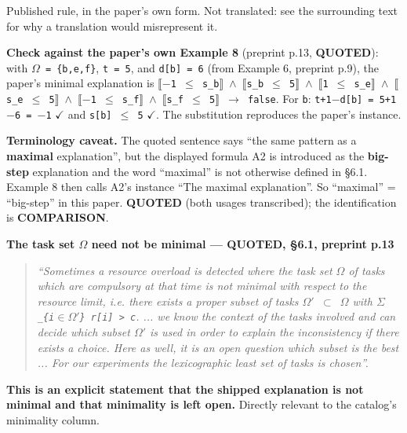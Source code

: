 \documentclass[10pt,a4paper]{article}
\newcommand{\provtag}[2]{{\small\sffamily\bfseries\textcolor{#1}{#2}}}
\newenvironment{pubblock}{%
  \par\smallskip
  \def\FrameCommand{\textcolor{litbar}{\vrule width 2.5pt}\hspace{9pt}}%
  \MakeFramed{\advance\hsize-\width\FrameRestore}}%
  {\endMakeFramed\par\smallskip}
\newcommand{\litsubsub}[1]{\par{\sffamily\bfseries\small #1\par}}
\newcommand{\rulekind}[1]{\par{\small\sffamily\textcolor{litbar}{#1}\par}}
\newcommand{\litline}[1]{\noindent
  \resizebox{\ifdim\width>\linewidth\linewidth\else\width\fi}{!}{#1}\par}
\begin{document}
\begin{pubblock}
\rulekind{Published rule, in the paper's own form. Not translated: see the surrounding text for why a translation would misrepresent it.}
{\raggedright
\litline{\ttfamily\small $\forall$i $\in$ $\Omega$ : $\llbracket$t + 1 $-$ d[i] $\leq$ s[i]$\rrbracket$ $\wedge$ $\llbracket$s[i] $\leq$ t$\rrbracket$ $\rightarrow$ false}
\par}
\textbf{Check against the paper's own Example 8} (preprint p.13, \provtag{tagquoted}{QUOTED}): with \texttt{$\Omega$ = \{b,e,f\}}, \texttt{t = 5}, and \texttt{d[b] = 6} (from Example 6, preprint p.9), the paper's minimal explanation is \texttt{$\llbracket$$-\allowbreak{}$1 $\leq$ s\_\allowbreak{}b$\rrbracket$ $\wedge$ $\llbracket$s\_\allowbreak{}b $\leq$ 5$\rrbracket$ $\wedge$ $\llbracket$1 $\leq$ s\_\allowbreak{}e$\rrbracket$ $\wedge$ $\llbracket$s\_\allowbreak{}e $\leq$ 5$\rrbracket$ $\wedge$ $\llbracket$$-\allowbreak{}$1 $\leq$ s\_\allowbreak{}f$\rrbracket$ $\wedge$ $\llbracket$s\_\allowbreak{}f $\leq$ 5$\rrbracket$ $\rightarrow$ false}. For \texttt{b}: \texttt{t+1$-$d[b] = 5+1$-$6 = $-$1} $\checkmark$ and \texttt{s[b] $\leq$ 5} $\checkmark$. The substitution reproduces the paper's instance.

\textbf{Terminology caveat.} The quoted sentence says ``the same pattern as a \textbf{maximal} explanation'', but the displayed formula A2 is introduced as the \textbf{big-step} explanation and the word ``maximal'' is not otherwise defined in \S{}6.1. Example 8 then calls A2's instance ``The maximal explanation''. So ``maximal'' = ``big-step'' in this paper. \provtag{tagquoted}{QUOTED} (both usages transcribed); the identification is \provtag{tagcomparison}{COMPARISON}.

\litsubsub{The task set \texttt{$\Omega$} need not be minimal --- \provtag{tagquoted}{QUOTED}, \S{}6.1, preprint p.13}
\begin{quotation}\small\itshape
``Sometimes a resource overload is detected where the task set \texttt{$\Omega$} of tasks which are compulsory at that time is not minimal with respect to the resource limit, i.e. there exists a proper subset of tasks \texttt{$\Omega$$'$ $\subset$ $\Omega$} with \texttt{$\Sigma$\_\{i$\in$$\Omega$$'$\} r[i] > c}. ... we know the context of the tasks involved and can decide which subset \texttt{$\Omega$$'$} is used in order to explain the inconsistency if there exists a choice. Here as well, it is an open question which subset is the best ... For our experiments the lexicographic least set of tasks is chosen''.
\end{quotation}
\textbf{This is an explicit statement that the shipped explanation is not minimal and that minimality is left open.} Directly relevant to the catalog's minimality column.


\end{pubblock}
\end{document}
